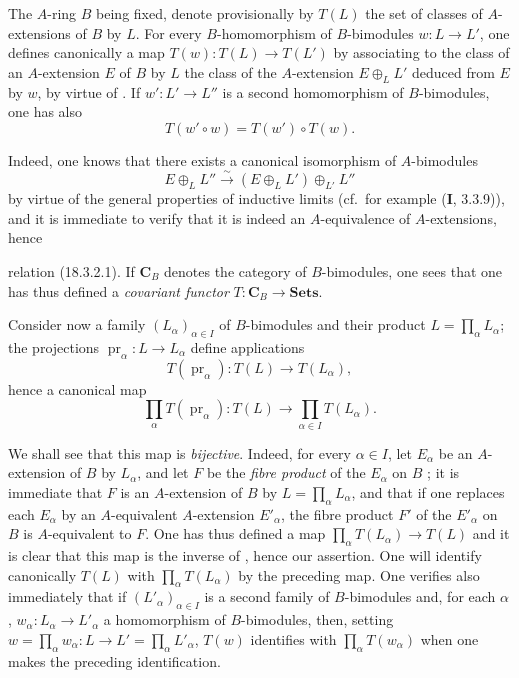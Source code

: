 \begin{env}[18.3.2]
\label{0.18.3.2}
The $A$-ring $B$ being fixed, denote provisionally by $T(L)$ the set of classes of $A$-extensions of $B$ by $L$.
For every $B$-homomorphism of $B$-bimodules $w:L\to L'$, one defines canonically a map $T(w):T(L)\to T(L')$ by associating to the class of an $A$-extension $E$ of $B$ by $L$ the class of the $A$-extension $E\oplus_L L'$ deduced from $E$ by $w$, by virtue of .
If $w':L'\to L''$ is a second homomorphism of $B$-bimodules, one has also
\begin{equation}
\tag{18.3.2.1}
  \label{0.18.3.2.1}
  T(w'\circ w)=T(w')\circ T(w).
\end{equation}

Indeed, one knows that there exists a canonical isomorphism of $A$-bimodules
\[
  E\oplus_L L''\xrightarrow{\sim}(E\oplus_L L')\oplus_{L'} L''
\]
by virtue of the general properties of inductive limits (cf.\ for example ($\mathbf{I}$, 3.3.9)), and it is immediate to verify that it is indeed an $A$-equivalence of $A$-extensions, hence


relation (18.3.2.1). If $\mathbf C_B$ denotes the category of $B$-bimodules, one sees that one has thus defined a \emph{covariant functor} $T:\mathbf C_B\to\mathbf{Sets}$.
\end{env}

\begin{env}[18.3.3]
\label{0.18.3.3}
Consider now a family $(L_\alpha)_{\alpha\in I}$ of $B$-bimodules and their product $L=\prod_\alpha L_\alpha$; the projections $\operatorname{pr}_\alpha:L\to L_\alpha$ define applications
\[
  T(\operatorname{pr}_\alpha):T(L)\to T(L_\alpha),
\]
hence a canonical map
\begin{equation}
\tag{18.3.3.1}
  \label{0.18.3.3.1}
  \prod_\alpha T(\operatorname{pr}_\alpha):T(L)\to\prod_{\alpha\in I} T(L_\alpha).
\end{equation}

We shall see that this map is \emph{bijective}.
Indeed, for every $\alpha\in I$, let $E_\alpha$ be an $A$-extension of $B$ by $L_\alpha$, and let $F$ be the \emph{fibre product} of the $E_\alpha$ on $B$ ; it is immediate that $F$ is an $A$-extension of $B$ by $L=\prod_\alpha L_\alpha$, and that if one replaces each $E_\alpha$ by an $A$-equivalent $A$-extension $E'_\alpha$, the fibre product $F'$ of the $E'_\alpha$ on $B$ is $A$-equivalent to $F$.
One has thus defined a map $\prod_\alpha T(L_\alpha)\to T(L)$ and it is clear that this map is the inverse of , hence our assertion.
One will identify canonically $T(L)$ with $\prod_\alpha T(L_\alpha)$ by the preceding map.
One verifies also immediately that if $(L'_\alpha)_{\alpha\in I}$ is a second family of $B$-bimodules and, for each $\alpha$, $w_\alpha:L_\alpha\to L'_\alpha$ a homomorphism of $B$-bimodules, then, setting $w=\prod_\alpha w_\alpha:L\to L'=\prod_\alpha L'_\alpha$, $T(w)$ identifies with $\prod_\alpha T(w_\alpha)$ when one makes the preceding identification.
\end{env}

